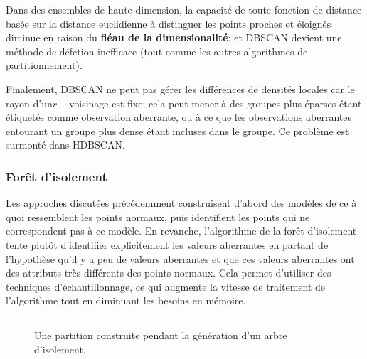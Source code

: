 \par Dans des ensembles de haute dimension, la capacité de toute fonction de distance basée sur la distance euclidienne à distinguer les points proches et éloignés diminue en raison du \textbf{fl\'eau de la dimensionalit\'e}; et DBSCAN devient une m\'ethode de d\'efction inefficace (tout comme les autres algorithmes de partitionnement). \par Finalement, DBSCAN ne peut pas gérer les différences de densités locales car le rayon d'un$r-$voisinage est fixe; cela peut mener à des groupes plus éparses \'etant étiquetés comme observation aberrante, ou à ce que les observations aberrantes entourant un groupe plus dense \'etant incluses dans le groupe. Ce problème est surmonté dans HDBSCAN.

\subsubsection*{Forêt d'isolement}
Les approches discutées précédemment construisent d'abord des modèles de ce à quoi ressemblent les points normaux, puis identifient les points qui ne correspondent pas à ce modèle.
En revanche, l'algorithme de la forêt d'isolement \cite{A15} tente plutôt d'identifier explicitement les valeurs aberrantes en partant de l'hypothèse qu'il y a peu de valeurs aberrantes et que ces valeurs aberrantes ont des attributs très différents des points normaux. Cela permet d'utiliser des techniques d'échantillonnage, ce qui augmente la vitesse de traitement de l'algorithme tout en diminuant les besoins en mémoire.
\begin{figure}[b]
\hrule \vspace{0.4cm}\centering
{}
\caption{Une partition construite pendant la génération d'un arbre d'isolement.}
\label{isolationtree}
\end{figure}

